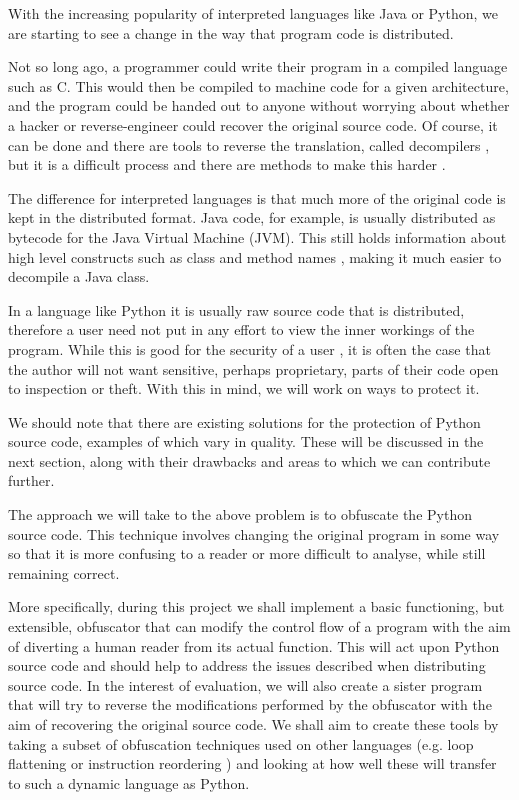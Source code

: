 \documentclass[twoside,a4paper]{report}
\begin{document}
With the increasing popularity of interpreted languages like Java or Python, we are starting
to see a change in the way that program code is distributed.

Not so long ago, a programmer could write their program in a compiled language such as C. This would then be compiled
to machine code for a given architecture, and the program could be handed out to anyone without
worrying about whether a hacker or reverse-engineer could recover the original source code.
Of course, it can be done and there are tools to reverse the translation, called decompilers \cite{cdecomp}, but it
is a difficult process and there are methods to make this harder \cite{disres}.

The difference for interpreted languages is that much more of the original code is kept in the
distributed format. Java code, for example, is usually distributed as bytecode for the Java Virtual
Machine (JVM). This still holds information about high level constructs such as class and method names \cite{classinfo},
making it much easier to decompile a Java class.

In a language like Python it is usually raw source code that is distributed, therefore a
user need not put in any effort to view the inner workings of the program. While this is good
for the security of a user \cite{noobf}, it is often the case that the author will not want sensitive,
perhaps proprietary, parts of their code open to inspection or theft. With this in mind, we will work on ways to protect it.

We should note that there are existing solutions for the protection of Python source code, examples of which vary in quality.
These will be discussed in the next section, along with their drawbacks and areas to which we can contribute further.

The approach we will take to the above problem is to obfuscate the Python source code. This technique involves changing the
original program in some way so that it is more confusing to a reader or more difficult to analyse, while still remaining correct.

More specifically, during this project we shall implement a basic functioning, but extensible, obfuscator
that can modify the control flow of a program with the aim of diverting a human reader from its actual
function. This will act upon Python source code and should help to address the issues described when distributing source code.
In the interest of evaluation, we will also create a sister program that will try to reverse the modifications performed by the
obfuscator with the aim of recovering the original source code. 
We shall aim to create these tools by taking a subset of obfuscation techniques used on other languages (e.g.
loop flattening or instruction reordering \cite{taxobftrans}) and looking at how well these will transfer to such a dynamic language as Python.
\end{document}
